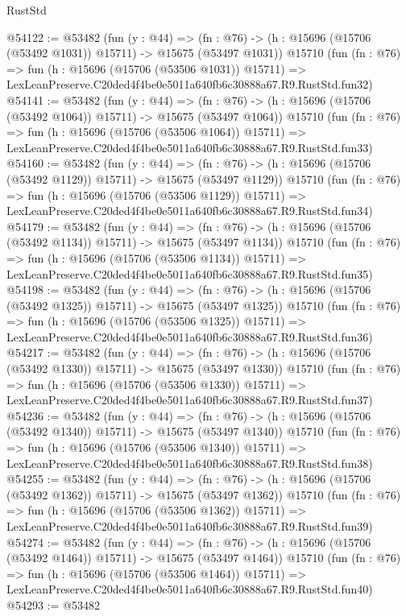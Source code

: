 \begin{lexlean}{RustStd}
\begin{coremodule}
@54122 := @53482
    (fun (y : @44) =>
    (fn : @76) -> (h : @15696 (@15706 (@53492 @1031)) @15711) -> @15675 (@53497 @1031))
    @15710
    (fun (fn : @76) =>
    fun (h : @15696 (@15706 (@53506 @1031)) @15711) =>
    LexLeanPreserve.C20ded4f4be0e5011a640fb6c30888a67.R9.RustStd.fun32)
@54141 := @53482
    (fun (y : @44) =>
    (fn : @76) -> (h : @15696 (@15706 (@53492 @1064)) @15711) -> @15675 (@53497 @1064))
    @15710
    (fun (fn : @76) =>
    fun (h : @15696 (@15706 (@53506 @1064)) @15711) =>
    LexLeanPreserve.C20ded4f4be0e5011a640fb6c30888a67.R9.RustStd.fun33)
@54160 := @53482
    (fun (y : @44) =>
    (fn : @76) -> (h : @15696 (@15706 (@53492 @1129)) @15711) -> @15675 (@53497 @1129))
    @15710
    (fun (fn : @76) =>
    fun (h : @15696 (@15706 (@53506 @1129)) @15711) =>
    LexLeanPreserve.C20ded4f4be0e5011a640fb6c30888a67.R9.RustStd.fun34)
@54179 := @53482
    (fun (y : @44) =>
    (fn : @76) -> (h : @15696 (@15706 (@53492 @1134)) @15711) -> @15675 (@53497 @1134))
    @15710
    (fun (fn : @76) =>
    fun (h : @15696 (@15706 (@53506 @1134)) @15711) =>
    LexLeanPreserve.C20ded4f4be0e5011a640fb6c30888a67.R9.RustStd.fun35)
@54198 := @53482
    (fun (y : @44) =>
    (fn : @76) -> (h : @15696 (@15706 (@53492 @1325)) @15711) -> @15675 (@53497 @1325))
    @15710
    (fun (fn : @76) =>
    fun (h : @15696 (@15706 (@53506 @1325)) @15711) =>
    LexLeanPreserve.C20ded4f4be0e5011a640fb6c30888a67.R9.RustStd.fun36)
@54217 := @53482
    (fun (y : @44) =>
    (fn : @76) -> (h : @15696 (@15706 (@53492 @1330)) @15711) -> @15675 (@53497 @1330))
    @15710
    (fun (fn : @76) =>
    fun (h : @15696 (@15706 (@53506 @1330)) @15711) =>
    LexLeanPreserve.C20ded4f4be0e5011a640fb6c30888a67.R9.RustStd.fun37)
@54236 := @53482
    (fun (y : @44) =>
    (fn : @76) -> (h : @15696 (@15706 (@53492 @1340)) @15711) -> @15675 (@53497 @1340))
    @15710
    (fun (fn : @76) =>
    fun (h : @15696 (@15706 (@53506 @1340)) @15711) =>
    LexLeanPreserve.C20ded4f4be0e5011a640fb6c30888a67.R9.RustStd.fun38)
@54255 := @53482
    (fun (y : @44) =>
    (fn : @76) -> (h : @15696 (@15706 (@53492 @1362)) @15711) -> @15675 (@53497 @1362))
    @15710
    (fun (fn : @76) =>
    fun (h : @15696 (@15706 (@53506 @1362)) @15711) =>
    LexLeanPreserve.C20ded4f4be0e5011a640fb6c30888a67.R9.RustStd.fun39)
@54274 := @53482
    (fun (y : @44) =>
    (fn : @76) -> (h : @15696 (@15706 (@53492 @1464)) @15711) -> @15675 (@53497 @1464))
    @15710
    (fun (fn : @76) =>
    fun (h : @15696 (@15706 (@53506 @1464)) @15711) =>
    LexLeanPreserve.C20ded4f4be0e5011a640fb6c30888a67.R9.RustStd.fun40)
@54293 := @53482

\end{coremodule}
\end{lexlean}
